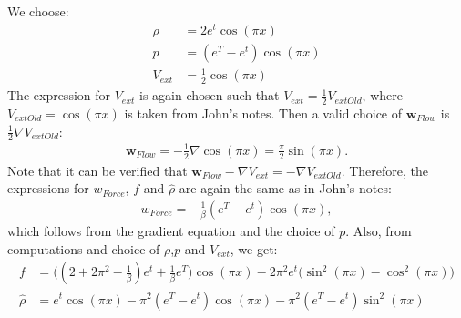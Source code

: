 \documentclass[11pt, a4paper]{article}
\theoremstyle{definition}
\newcommand{\Sta}{\rho}
\newcommand{\Adj}{p}
\begin{document}
We choose:
\begin{align*}
\Sta &= 2 e^t \cos(\pi x)\\
\Adj &=(e^T-e^t) \cos(\pi x)\\
V_{ext} &= \frac{1}{2} \cos(\pi x)
\end{align*}
The expression for $V_{ext}$ is again chosen such that $V_{ext}= \frac{1}{2}V_{extOld}  $, where $V_{extOld}=\cos(\pi x)$ is taken from John's notes. Then a valid choice of $\mathbf{w}_{Flow}$ is  $\frac{1}{2} \nabla V_{extOld}$:
\begin{align*}
\mathbf{w}_{Flow}= -\frac{1}{2} \nabla \cos(\pi x) = \frac{\pi}{2} \sin(\pi x).
\end{align*}
Note that it can be verified that $ \mathbf{w}_{Flow} - \nabla V_{ext}= - \nabla V_{extOld}$.
Therefore, the expressions for $w_{Force}$, $f$ and $\hat \Sta$ are again the same as in John's notes:
\begin{align*}
w_{Force}= -\frac{1}{\beta}(e^T - e^t)\cos(\pi x),
\end{align*}
which follows from the gradient equation and the choice of $\Adj$.
Also, from computations and choice of $\Sta$,$\Adj$ and $V_{ext}$, we get:
\begin{align*}
f&= \bigg( (2  + 2\pi^2 -\frac{1}{\beta} )e^t  + \frac{1}{\beta}e^T  \bigg)\cos(\pi x) - 2\pi^2e^t \bigg( \sin^2(\pi x) - \cos^2(\pi x)\bigg)\\
\hat \Sta &= e^t \cos(\pi x)- \pi^2(e^T -e^t)\cos(\pi x) - \pi^2(e^T -e^t)\sin^2(\pi x)
\end{align*}
\end{document}
